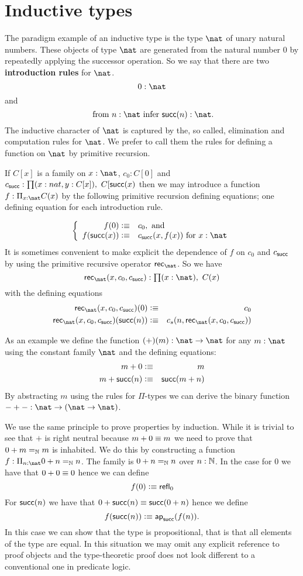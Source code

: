 \section{Inductive types}
\label{sec:inductive-types}

The paradigm example of an inductive type is the type $\nat$ of unary natural numbers.  These objects of type $\nat$ are generated from the natural number $0$ by repeatedly applying the successor operation.  So we say that there are two {\bf introduction rules} for $\nat$. 
  \[ 0:\nat\]
and
  \[ \mbox{ from $n:\nat$ infer $\suc(n):\nat$}.\]
The inductive character of $\nat$ is captured by the, so called, elimination and computation rules for $\nat$.  We prefer to call them the rules for defining a function on $\nat$ by primitive recursion. 

If $C[x]$ is a family on $x:\nat$, $c_0:C[0]$ and $c_\suc:\prd{x:nat,y:C[x]}C[\suc(x)$ then we may introduce a function $f:\Pi_{x:\nat}C(x)$ by the following primitive recursion defining equations; one defining equation for each introduction rule.

  \[\left\{\begin{array}{rl}
f(0)\defeq& c_0, \mbox{ and}\\
f(\suc(x))\defeq& c_\suc(x,f(x))\mbox{ for } x:\nat
  \end{array}\right.\]
It is sometimes convenient to make explicit the dependence of $f$ on $c_0$ and $c_{\mathsf{succ}}$ by using the primitive recursive operator $\rec{\nat}$.  So we have
  \[ \rec{\nat}(x,c_0,c_\suc):\prd{x:\nat}C(x)\]
with the defining equations
\begin{eqnarray*}
  \rec{\nat}(x,c_0,c_\suc)(0) & \defeq & c_0 \\
  \rec{\nat}(x,c_0,c_\suc)(\suc(n)) & \defeq & c_s(n, \rec{\nat}(x,c_0,c_\suc)) \\
\end{eqnarray*}

As an example we define the function $(+)(m) : \nat \to \nat$ for any
$m : \nat$ using the constant family $\nat$ and the defining
equations:
\begin{eqnarray*}
  m + 0 & \vcentcolon\equiv & m \\
  m + \mathsf{succ}(n) & \vcentcolon\equiv & \mathsf{succ}(m + n)
\end{eqnarray*}
By abstracting $m$ using the rules for $\Pi$-types we can derive the
binary function $- + - : \nat \to (\nat \to \nat)$.

We use the same principle to prove properties by induction. While it
is trivial to see that $+$ is right neutral because $m + 0 \equiv m$
we need to prove that $0 + m =_\mathbb{N} m$ is inhabited. We do this by
constructing a function $f : \Pi_{n : \nat} 0 + n =_\Nat n$. 
The family is $0 + n =_\mathbb{N} n$ over $n : \mathbb{N}$. In the case
for $0$ we have that $0 + 0 \equiv 0$ hence we can define
\[ f(0) \vcentcolon\equiv \mathsf{refl}_{0} \]
For $\mathsf{succ}(n)$ we have that $0 + \mathsf{succ}(n) \equiv \mathsf{succ}(0 +
n)$ hence we define 
\[ f(\mathsf{succ}(n)) \vcentcolon\equiv \mathsf{ap}_{\mathsf{succ}}(f(n)). \]
In this case we can show that the type is propositional, that is that
all elements of the type are equal. In this situation we may omit any
explicit reference to proof objects and the type-theoretic proof does
not look different to a conventional one in predicate logic. 

